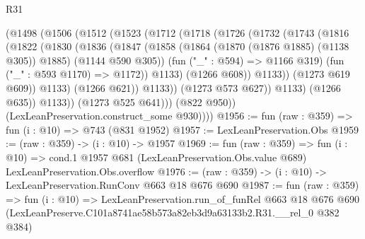 \begin{lexlean}{R31}
\begin{coremodule}
                  (@1498
                    (@1506
                      (@1512
                        (@1523
                          (@1712
                            (@1718
                              (@1726
                                (@1732
                                  (@1743
                                    (@1816
                                      (@1822
                                        (@1830
                                          (@1836
                                            (@1847
                                              (@1858
                                                (@1864 (@1870 (@1876 @1885) (@1138 @305)) @1885)
                                                (@1144 @590 @305))
                                              (fun ("_" : @594) => @1166 @319)
                                              (fun ("_" : @593 @1170) => @1172))
                                            @1133)
                                          (@1266 @608))
                                        @1133))
                                    (@1273 @619 @609))
                                  @1133)
                                (@1266 @621))
                              @1133))
                          (@1273 @573 @627))
                        @1133)
                      (@1266 @635))
                    @1133))
                (@1273 @525 @641)))
            (@822 @950))
          (LexLeanPreservation.construct_some @930))))
@1956 := fun (raw : @359) => fun (i : @10) => @743 (@831 @1952)
@1957 := LexLeanPreservation.Obs
@1959 := (raw : @359) -> (i : @10) -> @1957
@1969 := fun (raw : @359) =>
  fun (i : @10) =>
  cond.{1} @1957 @681 (LexLeanPreservation.Obs.value @689) LexLeanPreservation.Obs.overflow
@1976 := (raw : @359) -> (i : @10) -> LexLeanPreservation.RunConv @663 @18 @676 @690
@1987 := fun (raw : @359) =>
  fun (i : @10) =>
  LexLeanPreservation.run_of_funRel
    @663
    @18
    @676
    @690
    (LexLeanPreserve.C101a8741ae58b573a82eb3d9a63133b2.R31.__rel_0 @382 @384)
\end{coremodule}
\end{lexlean}
